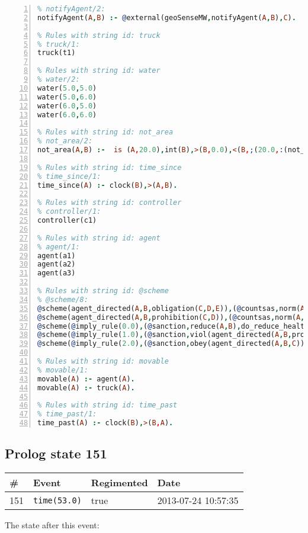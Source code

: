\documentclass[11pt]{article}\usepackage[utf8]{inputenc}\usepackage{geometry}
\begin{document}
\begin{lstlisting}[language=Prolog, numbers=left]
% Rules with string id: notifyAgent
% notifyAgent/2:
notifyAgent(A,B) :- @external(geoSenseMW,notifyAgent(A,B),C).

% Rules with string id: truck
% truck/1:
truck(t1)

% Rules with string id: water
% water/2:
water(5.0,5.0)
water(5.0,6.0)
water(6.0,5.0)
water(6.0,6.0)

% Rules with string id: not_area
% not_area/2:
not_area(A,B) :-  is (A,20.0),int(B),>(B,0.0),<(B,;(20.0,:(not_area(A,B), is (-(B),20.0)))),int(A),>(A,0.0),<(A,;(20.0,:(area(A,B),-(int(A))))),int(B),>(A,0.0),>(B,0.0),<(A,21.0),<(B,21.0).

% Rules with string id: time_since
% time_since/1:
time_since(A) :- clock(B),>(A,B).

% Rules with string id: controller
% controller/1:
controller(c1)

% Rules with string id: agent
% agent/1:
agent(a1)
agent(a2)
agent(a3)

% Rules with string id: @scheme
% @scheme/8:
@scheme(agent_directed(A,B,obligation(C,D,E)),(@countsas,norm(A,B,F,obligation(C,D,E)),F),false,(listTrue(C)),(time_past(D)),false,[plus(viol(agent_directed(A,B,obligation(C,D,E))))|[]],[plus(obey(agent_directed(A,B,obligation(C,D,E))))|[]])
@scheme(agent_directed(A,B,prohibition(C,D)),(@countsas,norm(A,B,E,prohibition(C,D)),E),(listTrue(C)),false,(false),false,[plus(viol(agent_directed(A,B,prohibition(C,D))))|[]],[plus(obey(agent_directed(A,B,prohibition(C,D))))|[]])
@scheme(@imply_rule(0.0),(@sanction,reduce(A,B),do_reduce_health(A,B),notifyAgent(A,changed(status))),true,false,false,false,[min(reduce(A,B))|[]],[])
@scheme(@imply_rule(1.0),(@sanction,viol(agent_directed(A,B,prohibition(C,D))),do_sanction(D)),true,false,false,false,[min(viol(agent_directed(A,B,prohibition(C,D))))|[]],[])
@scheme(@imply_rule(2.0),(@sanction,obey(agent_directed(A,B,C))),true,false,false,false,[min(obey(agent_directed(A,B,C)))|[]],[])

% Rules with string id: movable
% movable/1:
movable(A) :- agent(A).
movable(A) :- truck(A).

% Rules with string id: time_past
% time_past/1:
time_past(A) :- clock(B),>(B,A).

\end{lstlisting}
\clearpage 
\subsection{Prolog state 151}
\begin{table}[ht]
\centering 
\begin{tabular}{l l l l} 
\textbf{\#} & \textbf{Event} & \textbf{Regimented} & \textbf{Date} \\ [0.5ex] 
\hline
151&\texttt{time(53.0)}&true&2013-07-24 10:57:35\\ [1ex] \hline\end{tabular}
\end{table}
The state after this event:
\end{document}
